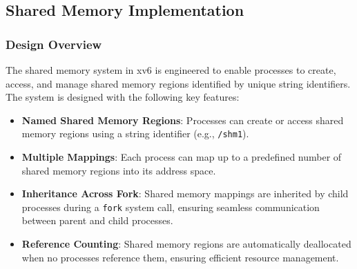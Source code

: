 \documentclass[12pt]{article}
\begin{document}
\subsection{Shared Memory Implementation}
\label{subsec:shared-memory-implementation}

\subsubsection{Design Overview}
\label{subsubsec:shared-memory-design}

The shared memory system in xv6 is engineered to enable processes to create, access, and manage shared memory regions identified by unique string identifiers. The system is designed with the following key features:
\begin{itemize}
  \item \textbf{Named Shared Memory Regions}: Processes can create or access shared memory regions using a string identifier (e.g., \texttt{/shm1}).
  \item \textbf{Multiple Mappings}: Each process can map up to a predefined number of shared memory regions into its address space.
  \item \textbf{Inheritance Across Fork}: Shared memory mappings are inherited by child processes during a \texttt{fork} system call, ensuring seamless communication between parent and child processes.
  \item \textbf{Reference Counting}: Shared memory regions are automatically deallocated when no processes reference them, ensuring efficient resource management.
\end{itemize}
\end{document}
